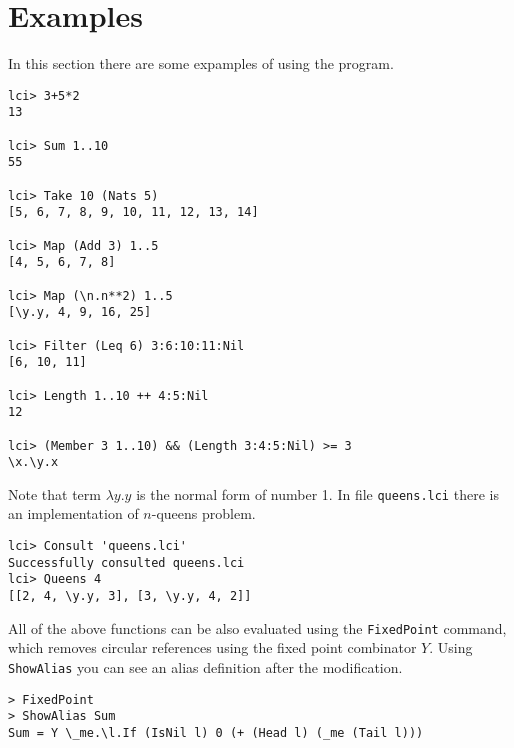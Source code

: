 \documentclass[a4paper,11pt]{article}
\newcommand{\kwd}[1]{\texttt{#1}}
\begin{document}
\section{Examples}
In this section there are some expamples of using the program.

\begin{verbatim}
lci> 3+5*2
13

lci> Sum 1..10
55

lci> Take 10 (Nats 5)
[5, 6, 7, 8, 9, 10, 11, 12, 13, 14]

lci> Map (Add 3) 1..5
[4, 5, 6, 7, 8]

lci> Map (\n.n**2) 1..5
[\y.y, 4, 9, 16, 25]

lci> Filter (Leq 6) 3:6:10:11:Nil
[6, 10, 11]

lci> Length 1..10 ++ 4:5:Nil
12

lci> (Member 3 1..10) && (Length 3:4:5:Nil) >= 3
\x.\y.x
\end{verbatim}

Note that term $\lambda y.y$ is the normal form of number 1. In file \kwd{queens.lci}
there is an implementation of $n$-queens problem.

\begin{verbatim}
lci> Consult 'queens.lci'
Successfully consulted queens.lci
lci> Queens 4
[[2, 4, \y.y, 3], [3, \y.y, 4, 2]]
\end{verbatim}

All of the above functions can be also evaluated using the \kwd{FixedPoint} command,
which removes circular references using the fixed point combinator $Y$. Using
\kwd{ShowAlias} you can see an alias definition after the modification.

\begin{verbatim}
> FixedPoint
> ShowAlias Sum
Sum = Y \_me.\l.If (IsNil l) 0 (+ (Head l) (_me (Tail l)))
\end{verbatim}
\end{document}

